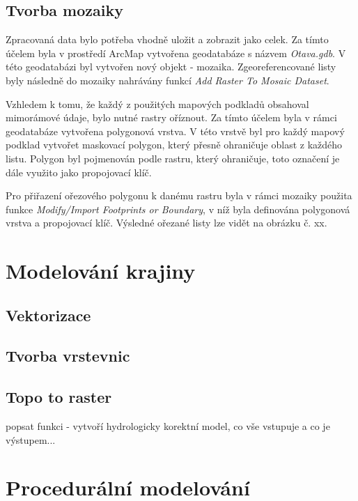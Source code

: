 \documentclass[thesis=M,czech]{FITthesis}[2012/06/26]
\begin{document}
\subsection{Tvorba mozaiky}
Zpracovaná data bylo potřeba vhodně uložit a zobrazit jako celek. Za tímto účelem byla v prostředí ArcMap vytvořena geodatabáze s názvem \textit{Otava.gdb}. V této geodatabázi byl vytvořen nový objekt - mozaika. Zgeoreferencované listy byly následně do mozaiky nahrávány funkcí \textit{Add Raster To Mosaic Dataset}.

Vzhledem k tomu, že každý z použitých mapových podkladů obsahoval mimorámové údaje, bylo nutné rastry oříznout. Za tímto účelem byla v rámci geodatabáze vytvořena polygonová vrstva. V této vrstvě byl pro každý mapový podklad vytvořet maskovací polygon, který přesně ohraničuje oblast z každého listu. Polygon byl pojmenován podle rastru, který ohraničuje, toto označení je dále využito jako propojovací klíč. 

Pro přiřazení ořezového polygonu k danému rastru byla v rámci mozaiky použita funkce \textit{Modify/Import Footprints or Boundary}, v níž byla definována polygonová vrstva a propojovací klíč. Výsledné ořezané listy lze vidět na obrázku č. xx. 






\section{Modelování krajiny}

\subsection{Vektorizace}

\subsection{Tvorba vrstevnic}


\subsection{Topo to raster}
popsat funkci - vytvoří hydrologicky korektní model, co vše vstupuje a co je výstupem...

\section{Procedurální modelování}
\end{document}

